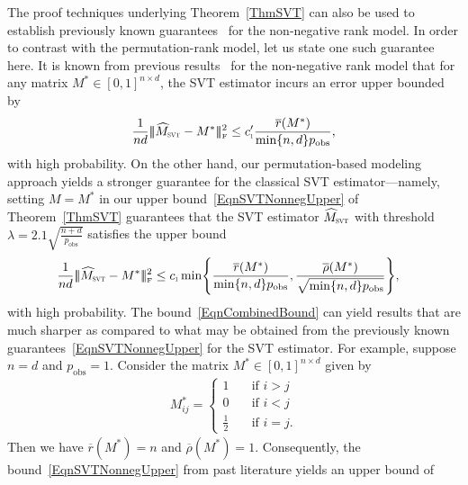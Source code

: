 \documentclass[11pt, hidelinks]{article} %
\newcommand{\matsnorm}[2]{|\!|\!| #1 | \! | \!|_{{#2}}}
\newcommand{\frobnorm}[1]{\ensuremath{\matsnorm{#1}{\mbox{\tiny{F}}}}}
\newcommand{\numrows}{n}
\newcommand{\numcols}{d}
\newcommand{\plaincon}{c}
\newcommand{\UUP}{\ensuremath{\plaincon_{\mbox{\scalebox{.5}{1}}}}}
\newcommand{\wtmatrix}{M}
\newcommand{\wt}{\wtmatrix}
\newcommand{\wtstar}{\wtmatrix^*}
\newcommand{\wthat}{\widehat{\wtmatrix}}
\newcommand{\pp}{\ensuremath{p_{\mathrm{obs}}}}
\newcommand{\nnrank}{r}
\newcommand{\permrank}{\rho}
\newcommand{\fnpermrank}[1]{\overline{\permrank}(#1)}
\newcommand{\fnnnrank}[1]{\overline{\nnrank}(#1)}
\newcommand{\regpar}{\ensuremath{\lambda}}
\newcommand{\wthatSVT}{\wthat_{\mbox{\scalebox{.5}{SVT}}}}
\begin{document}
The proof techniques underlying Theorem~\ref{ThmSVT} can
also be used to establish previously known
guarantees~\cite{koltchinskii2011nuclear,chatterjee2014matrix} for the
non-negative rank model. In order to contrast with the
permutation-rank model, let us state one such guarantee here. It is known from previous results~\cite{koltchinskii2011nuclear,chatterjee2014matrix} for the non-negative rank model that for any matrix $\wtstar \in [0,1]^{\numrows \times \numcols}$, the SVT estimator incurs an error upper bounded by
\begin{align}
  \label{EqnSVTNonnegUpper}
  \frac{1}{\numrows \numcols} \frobnorm{\wthatSVT - \wtstar}^2 \leq
  \UUP' \frac{\fnnnrank{\wtstar}}{ \min \{\numrows, \numcols \} \pp },
\end{align}
with high probability. 
On the other hand, our permutation-based modeling approach yields a stronger guarantee for the classical SVT estimator---namely, setting $\wt = \wtstar$ in our upper bound~\eqref{EqnSVTNonnegUpper} of Theorem~\ref{ThmSVT} guarantees that the
SVT estimator $\wthatSVT$ with threshold $\regpar = 2.1
\sqrt{\frac{\numrows+\numcols}{\pp}}$ satisfies the upper bound
\begin{align}
  \label{EqnCombinedBound}
  \frac{1}{\numrows \numcols} \frobnorm{\wthatSVT - \wtstar}^2 & \leq
  \UUP \min \Biggr \{ \frac{\fnnnrank{\wtstar}}{ \min \{\numrows,
    \numcols \} \pp}, \frac{\fnpermrank{\wtstar}}{ \sqrt{\min
      \{\numrows, \numcols \} \pp } } \Biggr \},
\end{align}
with high probability. The bound~\eqref{EqnCombinedBound} can yield results that are much sharper as compared to what may be obtained from the previously known guarantees~\eqref{EqnSVTNonnegUpper} for the SVT estimator. For example, suppose $\numrows = \numcols$ and $\pp = 1$. Consider the matrix $\wtstar \in [0,1]^{\numrows \times \numcols}$ given by
\begin{align*}
\wtstar_{ij} = 
\begin{cases}
1 & \quad \text{if $i > j$} \\
0 & \quad \text{if $i < j$} \\
\frac{1}{2} & \quad \text{if $i=j$}.
\end{cases}
\end{align*}
Then we have $\fnnnrank{\wtstar} = \numrows$ and $\fnpermrank{\wtstar} = 1$. Consequently, the bound~\eqref{EqnSVTNonnegUpper} from past literature yields an upper bound of
\end{document}

